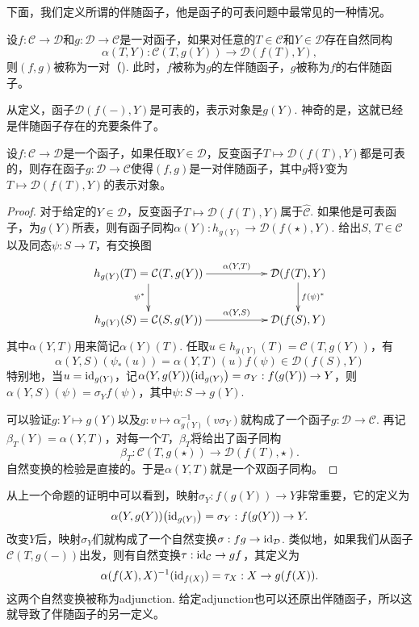 下面，我们定义所谓的伴随函子，他是函子的可表问题中最常见的一种情况。

\begin{para}[伴随函子]
	设$f:\mathcal{C}\to \mathcal{D}$和$g:\mathcal{D}\to \mathcal{C}$是一对函子，如果对任意的$T\in\mathcal{C}$和$Y\in\mathcal{D}$存在自然同构
	\[
		\alpha(T,Y):\mathcal{C}(T,g(Y))\to \mathcal{D}(f(T),Y),
	\]
	则$(f,g)$被称为一对（). 此时，$f$被称为$g$的左伴随函子，$g$被称为$f$的右伴随函子。
\end{para}

从定义，函子$\mathcal{D}(f(-),Y)$是可表的，表示对象是$g(Y)$. 神奇的是，这就已经是伴随函子存在的充要条件了。

\begin{pro}
	设$f:\mathcal{C}\to \mathcal{D}$是一个函子，如果任取$Y\in \mathcal D$，反变函子$T\mapsto {\mathcal{D}}(f(T),Y)$都是可表的，则存在函子$g:\mathcal D\to \mathcal C$使得$(f,g)$是一对伴随函子，其中$g$将$Y$变为$T\mapsto {\mathcal{D}}(f(T),Y)$的表示对象。
\end{pro}

\begin{proof} 
	对于给定的$Y\in\mathcal{D}$，反变函子$T\mapsto {\mathcal{D}}(f(T),Y)$属于$\hat{\mathcal{C}}$. 如果他是可表函子，为$g(Y)$所表，则有函子同构$\alpha(Y):h_{g(Y)}\to {\mathcal{D}}(f(\star),Y)$. 给出$S$, $T\in \mathcal{C}$以及同态$\psi:S\to T$，有交换图
	\[
	\begin{xy}
		\xymatrix{
			h_{g(Y)}(T)=\mathcal{C}(T,g(Y))\ar[rr]^-{\alpha(Y,T)} \ar[d]_{\psi^*}&&{\mathcal{D}}(f(T),Y) \ar[d]^{f(\psi)^*}\\
			h_{g(Y)}(S)=\mathcal{C}(S,g(Y))\ar[rr]^-{\alpha(Y,S)}&&{\mathcal{D}}(f(S),Y)
		}
	\end{xy}
	\]
	其中$\alpha(Y,T)$用来简记$\alpha(Y)(T)$. 任取$u\in h_{g(Y)}(T)=\mathcal{C}(T,g(Y))$，有
	\[
		\alpha(Y,S)(\psi_{*}(u)) =\alpha(Y,T)(u)f(\psi)\in {\mathcal{D}}(f(S),Y)
	\]
	特别地，当$u=\operatorname{id}_{g(Y)}$，记$\alpha(Y,g(Y))\bigl(\operatorname{id}_{g(Y)}\bigr)=\sigma_Y:f(g(Y))\to Y$，则$\alpha(Y,S)(\psi)=\sigma_Y f(\psi)$，其中$\psi:S\to g(Y)$.

	可以验证$g:Y\mapsto g(Y)$以及$g:v\mapsto \alpha^{-1}_{g(Y)}\left(v\sigma_Y\right)$就构成了一个函子$g:\mathcal{D}\to \mathcal{C}$. 再记$\beta_T(Y)=\alpha(Y,T)$，对每一个$T$，$\beta_T$将给出了函子同构
	\[
		\beta_T:\mathcal{C}(T,g(\star))\to \mathcal{D}(f(T),\star).
	\]
	自然变换的检验是直接的。于是$\alpha(Y,T)$就是一个双函子同构。
\end{proof}

从上一个命题的证明中可以看到，映射$\sigma_Y:f(g(Y))\to Y$非常重要，它的定义为
\[
	\alpha(Y,g(Y))\bigl(\operatorname{id}_{g(Y)}\bigr)=\sigma_Y:f(g(Y))\to Y.
\]
改变$Y$后，映射$\sigma_Y$们就构成了一个自然变换$\sigma:fg\to \operatorname{id}_{\mathcal D}$. 类似地，如果我们从函子$\mathcal C(T,g(-))$出发，则有自然变换$\tau:\operatorname{id}_{\mathcal C}\to gf$，其定义为
\[
	\alpha(f(X),X)^{-1}(\operatorname{id}_{f(X)})=\tau_X:X\to g(f(X)).
\]
这两个自然变换被称为adjunction. 给定adjunction也可以还原出伴随函子，所以这就导致了伴随函子的另一定义。

